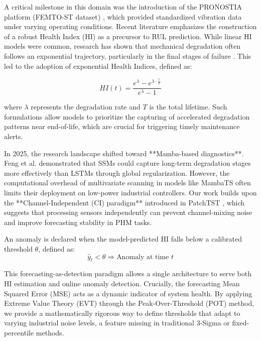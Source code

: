 \documentclass{ieeeaccess}
\begin{document}
{A critical milestone in this domain was the introduction of the PRONOSTIA platform (FEMTO-ST dataset) \cite{nectoux2012pronostia}, which provided standardized vibration data under varying operating conditions. Recent literature emphasizes the construction of a robust Health Index (HI) as a precursor to RUL prediction. While linear HI models were common, research has shown that mechanical degradation often follows an exponential trajectory, particularly in the final stages of failure \cite{qian2017bearing}. This led to the adoption of exponential Health Indices, defined as:

\begin{equation}
    HI(t) = \frac{e^{\lambda} - e^{\lambda \cdot \frac{t}{T}}}{e^{\lambda} - 1}
    \label{eq:hi_model}
\end{equation}

\noindent where $\lambda$ represents the degradation rate and $T$ is the total lifetime. Such formulations allow models to prioritize the capturing of accelerated degradation patterns near end-of-life, which are crucial for triggering timely maintenance alerts.

In 2025, the research landscape shifted toward **Mamba-based diagnostics**. Feng et al. \cite{feng2025femamba} demonstrated that SSMs could capture long-term degradation stages more effectively than LSTMs through global regularization. However, the computational overhead of multivariate scanning in models like MambaTS often limits their deployment on low-power industrial controllers. Our work builds upon the **Channel-Independent (CI) paradigm** introduced in PatchTST \cite{nie2023patchtst}, which suggests that processing sensors independently can prevent channel-mixing noise and improve forecasting stability in PHM tasks.

An anomaly is declared when the model-predicted HI falls below a calibrated threshold $\theta$, defined as:
\begin{equation}
    \hat{y}_{t} < \theta \Rightarrow \text{Anomaly at time } t
    \label{eq:anomaly_rule}
\end{equation}

\noindent This forecasting-as-detection paradigm allows a single architecture to serve both HI estimation and online anomaly detection. Crucially, the forecasting Mean Squared Error (MSE) acts as a dynamic indicator of system health. By applying Extreme Value Theory (EVT) through the Peak-Over-Threshold (POT) method, we provide a mathematically rigorous way to define thresholds that adapt to varying industrial noise levels, a feature missing in traditional 3-Sigma or fixed-percentile methods.

}
\end{document}

